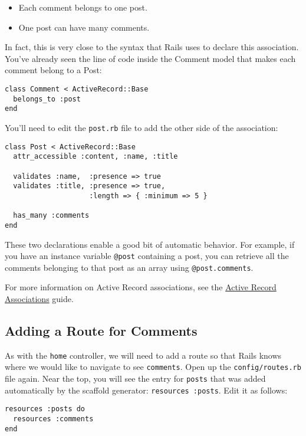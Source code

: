 \documentclass[10pt]{book}
\begin{document}
\begin{itemize}
	\item Each comment belongs to one post.
	\item One post can have many comments.
\end{itemize}

In fact, this is very close to the syntax that Rails uses to declare this association. You’ve already seen the line of code inside the Comment model that makes each comment belong to a Post:

\begin{verbatim}
class Comment < ActiveRecord::Base
  belongs_to :post
end
\end{verbatim}

You’ll need to edit the \texttt{post.rb} file to add the other side of the association:

\begin{verbatim}
class Post < ActiveRecord::Base
  attr_accessible :content, :name, :title
 
  validates :name,  :presence => true
  validates :title, :presence => true,
                    :length => { :minimum => 5 }
 
  has_many :comments
end
\end{verbatim}

These two declarations enable a good bit of automatic behavior. For example, if you have an instance variable \texttt{@post} containing a post, you can retrieve all the comments belonging to that post as an array using \texttt{@post.comments}.

For more information on Active Record associations, see the \href{http://guides.rubyonrails.org/association_basics.html}{Active Record Associations} guide.

\subsection{ Adding a Route for Comments}

As with the \texttt{home} controller, we will need to add a route so that Rails knows where we would like to navigate to see \texttt{comments}. Open up the \texttt{config/routes.rb} file again. Near the top, you will see the entry for \texttt{posts} that was added automatically by the scaffold generator: \texttt{resources :posts}. Edit it as follows:

\begin{verbatim}
resources :posts do
  resources :comments
end
\end{verbatim}
\end{document}
